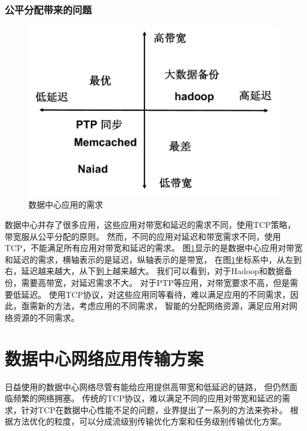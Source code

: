 \subsubsection{公平分配带来的问题}

\begin{figure}[b]
\begin{center}
\includegraphics [width=0.9\columnwidth] {figures/others/require.pdf}
\caption{数据中心应用的需求}
\label{relatedwork-require-fig}
\end{center}
\end{figure}


数据中心并存了很多应用，这些应用对带宽和延迟的需求不同，使用TCP策略，带宽服从公平分配的原则。
然而，不同的应用对延迟和带宽需求不同，使用TCP，不能满足所有应用对带宽和延迟的需求。
图\ref{relatedwork-require-fig}显示的是数据中心应用对带宽和延迟的需求，横轴表示的是延迟，纵轴表示的是带宽，
在图\ref{relatedwork-require-fig}坐标系中，从左到右，延迟越来越大，从下到上越来越大。
我们可以看到，对于Hadoop和数据备份，需要高带宽，对延迟需求不大。
对于PTP等应用，对带宽要求不高，但是需要低延迟。
使用TCP协议，对这些应用同等看待，难以满足应用的不同需求，因此，亟需新的方法，考虑应用的不同需求，
智能的分配网络资源，满足应用对网络资源的不同需求。



\section{数据中心网络应用传输方案}
日益使用的数据中心网络尽管有能给应用提供高带宽和低延迟的链路，
 但仍然面临频繁的网络拥塞\cite{Incast08, Incast09}。
传统的TCP协议，难以满足不同的应用对带宽和延迟的需求，针对TCP在数据中心性能不足的问题，业界提出了一系列的方法来弥补。
根据方法优化的粒度，可以分成流级别传输优化方案和任务级别传输优化方案。

